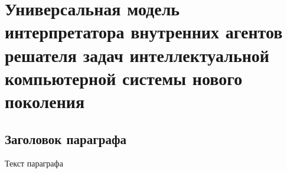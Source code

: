 \chapter{Универсальная модель интерпретатора внутренних агентов решателя задач интеллектуальной компьютерной системы нового поколения}
\label{chapter_interpreter}


\section{Заголовок параграфа}
Текст параграфа

%
